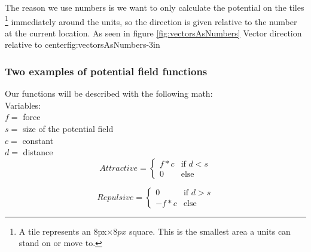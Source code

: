 		The reason we use numbers is we want to only calculate the potential on the tiles \footnote{A tile represents an 8px$\times8px$ square. This is the smallest area a units can stand on or move to.} immediately around the units, so the direction is given relative to the number at the current location. As seen in figure \ref{fig:vectorsAsNumbers}
		{Vector direction relative to center}{fig:vectorsAsNumbers}{-3in}
		\\
		
		\subsubsection{Two examples of potential field functions}
		Our functions will be described with the following math: \\
		
		Variables:\\
		$f =$ force\\
		$s =$ size of the potential field\\
		$c =$ constant\\
		$d =$ distance\\
		
		\begin{displaymath}
			Attractive = \begin{cases}
					f * c & \text{if $d < s$}\\
					0 & \text{else}
				\end{cases}		
		\end{displaymath}
			
		\begin{displaymath}
			Repulsive = \begin{cases}
					0 & \text{if $d > s$}\\
					- f * c & \text{else}
				\end{cases}		
		\end{displaymath}
		
		
